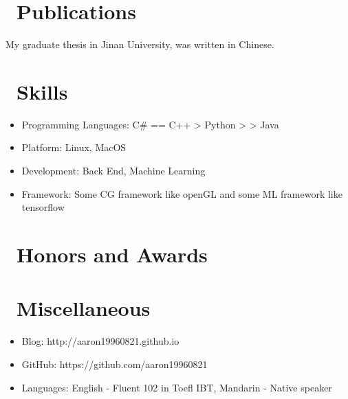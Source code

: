 \documentclass{resume}
\begin{document}
\section{\faCogs\ Publications}
My graduate thesis in Jinan University, was written in Chinese.

\section{\faCogs\ Skills}
\begin{itemize}[parsep=0.5ex]
  \item Programming Languages: C\# == C++ > Python > > Java
  \item Platform: Linux, MacOS
  \item Development: Back End, Machine Learning
	\item Framework: Some CG framework like openGL and some ML framework like tensorflow
\end{itemize}

\section{\faHeartO\ Honors and Awards}

\section{\faInfo\ Miscellaneous}
\begin{itemize}[parsep=0.5ex]
  \item Blog: http://aaron19960821.github.io
  \item GitHub: https://github.com/aaron19960821
  \item Languages: English - Fluent 102 in Toefl IBT, Mandarin - Native speaker
\end{itemize}
\end{document}
